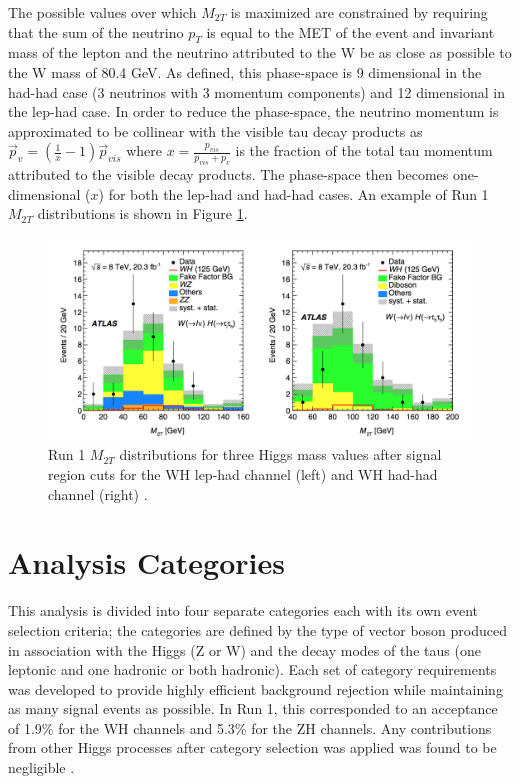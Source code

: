 The possible values over which $M_{2T}$ is maximized are constrained by requiring that the sum of the neutrino $p_T$ is equal to the MET of the event and invariant mass of the lepton and the neutrino attributed to the W be as close as possible to the W mass of 80.4 GeV. As defined, this phase-space is 9 dimensional in the had-had case (3 neutrinos with 3 momentum components) and 12 dimensional in the lep-had case. In order to reduce the phase-space, the neutrino momentum is approximated to be collinear with the visible tau decay products as $\Vec{p}_v=(\frac{1}{x}-1)\Vec{p}_{vis}$ where $x=\frac{p_{vis}}{p_{vis}+p_v}$ is the fraction of the total tau momentum attributed to the visible decay products. The phase-space then becomes one-dimensional ($x$) for both the lep-had and had-had cases. An example of Run 1 $M_{2T}$ distributions is shown in Figure \ref{fig:m2t_plots}.

\begin{figure}[htb!]
    \centering
    \includegraphics[width=5in]{figures/chapter6/m2t_plots.png}
    \caption{Run 1 $M_{2T}$ distributions for three Higgs mass values after signal region cuts for the WH lep-had channel (left) and WH had-had channel (right) \cite{vh_run1_paper}.}
    \label{fig:m2t_plots}
\end{figure}

\section{Analysis Categories}\label{sec:anal_cats}
This analysis is divided into four separate categories each with its own event selection criteria; the categories are defined by the type of vector boson produced in association with the Higgs (Z or W) and the decay modes of the taus (one leptonic and one hadronic or both hadronic). Each set of category requirements was developed to provide highly efficient background rejection while maintaining as many signal events as possible. In Run 1, this corresponded to an acceptance of 1.9\% for the WH channels and 5.3\% for the ZH channels. Any contributions from other Higgs processes after category selection was applied was found to be negligible \cite{vh_run1_paper}. \\

